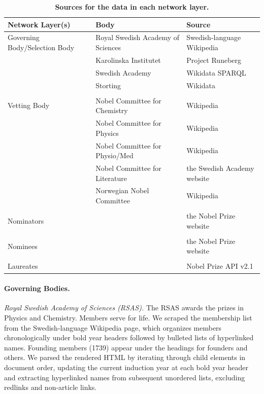 \documentclass[12pt]{article}
\begin{document}
\begin{table}
\centering
\caption{\textbf{Sources for the data in each network layer.}}
\label{tab:data_sources}
\small
\begin{tabular}{lll}
\hline
\textbf{Network Layer(s)} & \textbf{Body} & \textbf{Source} \\
\hline
Governing Body/Selection Body & Royal Swedish Academy of Sciences & Swedish-language Wikipedia \\
& Karolinska Institutet & Project Runeberg \cite{KarolinskaEmployees} \\
& Swedish Academy & Wikidata SPARQL \cite{wikidata} \\
& Storting & Wikidata \cite{wikidata} \\
\\
Vetting Body & Nobel Committee for Chemistry & Wikipedia \cite{NobelCommitteeChemistry} \\
& Nobel Committee for Physics & Wikipedia \cite{NobelCommitteePhysics} \\
& Nobel Committee for Physio/Med & Wikipedia \cite{NobelCommitteePhysiology} \\
& Nobel Committee for Literature & the Swedish Academy website \cite{Ledamotsregister} \\
& Norwegian Nobel Committee & Wikipedia \cite{NorwegianNobelCommittee} \\
\\
Nominators & & the Nobel Prize website \cite{NobelPrizeWebsite} \\
\\
Nominees & & the Nobel Prize website \cite{NobelPrizeWebsite} \\
\\
Laureates & & Nobel Prize API v2.1 \\
\hline
\end{tabular}
\end{table}

\paragraph*{Governing Bodies.}

\emph{Royal Swedish Academy of Sciences (RSAS).} The RSAS awards the prizes in Physics and Chemistry. Members serve for life. We scraped the membership list from the Swedish-language Wikipedia page, which organizes members chronologically under bold year headers followed by bulleted lists of hyperlinked names. Founding members (1739) appear under the headings for founders and others. We parsed the rendered HTML by iterating through child elements in document order, updating the current induction year at each bold year header and extracting hyperlinked names from subsequent unordered lists, excluding redlinks and non-article links.
\end{document}
